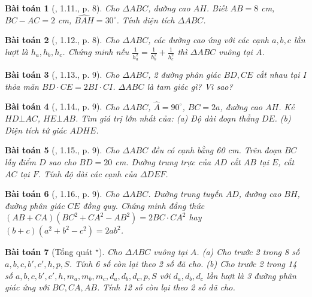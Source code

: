 \documentclass{article}
\newtheorem{baitoan}{Bài toán}
\begin{document}
\begin{baitoan}[\cite{TLCT_THCS_Toan_9_hinh_hoc}, 1.11., p. 8]
	Cho $\Delta ABC$, đường cao $AH$. Biết $AB = 8$ {\rm cm}, $BC - AC = 2$ {\rm cm}, $\widehat{BAH} = 30^\circ$. Tính diện tích $\Delta ABC$.
\end{baitoan}

\begin{baitoan}[\cite{TLCT_THCS_Toan_9_hinh_hoc}, 1.12., p. 8]
	Cho $\Delta ABC$, các đường cao ứng với các cạnh $a,b,c$ lần lượt là $h_a,h_b,h_c$. Chứng minh nếu $\frac{1}{h_a^2} = \frac{1}{h_b^2} + \frac{1}{h_c^2}$ thì $\Delta ABC$ vuông tại $A$.
\end{baitoan}

\begin{baitoan}[\cite{TLCT_THCS_Toan_9_hinh_hoc}, 1.13., p. 9]
	Cho $\Delta ABC$, 2 đường phân giác $BD,CE$ cắt nhau tại $I$ thỏa mãn $BD\cdot CE= 2BI\cdot CI$. $\Delta ABC$ là tam giác gì? Vì sao?
\end{baitoan}

\begin{baitoan}[\cite{TLCT_THCS_Toan_9_hinh_hoc}, 1.14., p. 9]
	Cho $\Delta ABC$, $\widehat{A} = 90^\circ$, $BC = 2a$, đường cao $AH$. Kẻ $HD\bot AC$, $HE\bot AB$. Tìm giá trị lớn nhất của: (a) Độ dài đoạn thẳng $DE$. (b) Diện tích tứ giác $ADHE$.
\end{baitoan}

\begin{baitoan}[\cite{TLCT_THCS_Toan_9_hinh_hoc}, 1.15., p. 9]
	Cho $\Delta ABC$ đều có cạnh bằng {\rm60 cm}. Trên đoạn $BC$ lấy điểm $D$ sao cho $BD = 20$ {\rm cm}. Đường trung trực của $AD$ cắt $AB$ tại $E$, cắt $AC$ tại $F$. Tính độ dài các cạnh của $\Delta DEF$.
\end{baitoan}

\begin{baitoan}[\cite{TLCT_THCS_Toan_9_hinh_hoc}, 1.16., p. 9]
	Cho $\Delta ABC$. Đường trung tuyến $AD$, đường cao $BH$, đường phân giác $CE$ đồng quy. Chứng minh đẳng thức $(AB + CA)(BC^2 + CA^2 - AB^2) = 2BC\cdot CA^2$ hay $(b + c)(a^2 + b^2 - c^2) = 2ab^2$.
\end{baitoan}

\begin{baitoan}[Tổng quát ${}^\star$]
	Cho $\Delta ABC$ vuông tại $A$. (a) Cho trước 2 trong 8 số $a,b,c,b',c',h,p,S$. Tính 6 số còn lại theo 2 số đã cho. (b) Cho trước 2 trong 14 số $a,b,c,b',c',h,m_a,m_b,m_c,d_a,d_b,d_c,p,S$ với $d_a,d_b,d_c$ lần lượt là 3 đường phân giác ứng với $BC,CA,AB$. Tính 12 số còn lại theo 2 số đã cho.
\end{baitoan}
\end{document}
